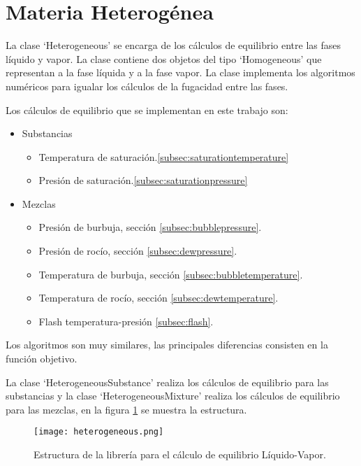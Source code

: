 \section{Materia Heterogénea}\label{sec:heterogeneous}

	La clase `Heterogeneous' se encarga de los cálculos de equilibrio entre las fases líquido y vapor. La clase contiene dos objetos del tipo `Homogeneous' que representan a la fase líquida y a la fase vapor. La clase implementa los algoritmos numéricos para igualar los cálculos de la fugacidad entre las fases.

	Los cálculos de equilibrio que se implementan en este trabajo son:

	\begin{itemize}\itemsep0ex

		\item Substancias
			\begin{itemize}\itemsep0ex
				\item Temperatura de saturación.\ref{subsec:saturationtemperature}
				\item Presión de saturación.\ref{subsec:saturationpressure}
			\end{itemize}

		\item Mezclas
	\begin{itemize}\itemsep0ex
		\item Presión de burbuja, sección \ref{subsec:bubblepressure}.
		\item Presión de rocío, sección \ref{subsec:dewpressure}.
		\item Temperatura de burbuja, sección \ref{subsec:bubbletemperature}.
		\item Temperatura de rocío, sección \ref{subsec:dewtemperature}.
		\item Flash temperatura-presión \ref{subsec:flash}.
	\end{itemize}

	\end{itemize}

	Los algoritmos son muy similares, las principales diferencias consisten en la función objetivo.

	La clase `HeterogeneousSubstance' realiza los cálculos de equilibrio para las substancias y la clase `HeterogeneousMixture' realiza los cálculos de equilibrio para las mezclas, en la figura \ref{fig:heterogeneous} se muestra la estructura.

\begin{figure}[!h]
  \centering
    \texttt{[image: heterogeneous.png]}
    \caption{Estructura de la librería para el cálculo de equilibrio Líquido-Vapor.}
    \label{fig:heterogeneous}
\end{figure}


